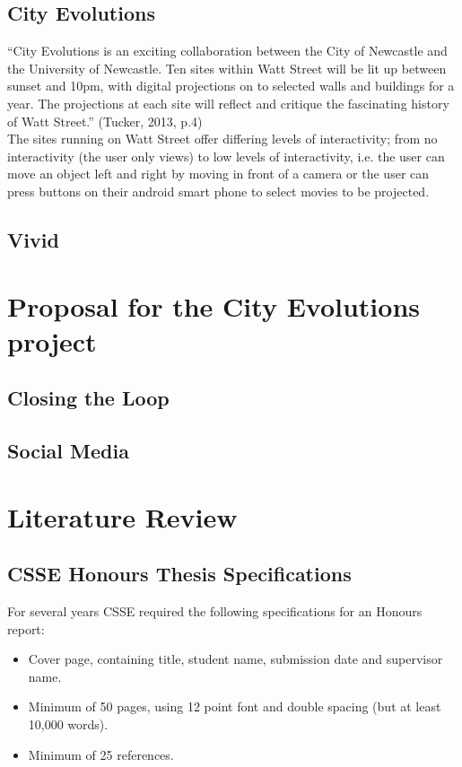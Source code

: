 \documentclass[a4,12pt]{article}
\begin{document}
\subsection{City Evolutions}
``City Evolutions is an exciting collaboration between the City of Newcastle and the University of Newcastle. Ten sites within Watt Street will be lit up between sunset and 10pm, with digital projections on to selected walls and buildings for a year. The projections at each site will reflect and critique the fascinating history of Watt Street.'' (Tucker, 2013, p.4)
\\
The sites running on Watt Street offer differing levels of interactivity; from no interactivity (the user only views) to low levels of interactivity, i.e. the user can move an object left and right by moving in front of a camera or the user can press buttons on their android smart phone to select movies to be projected.
\subsection{Vivid}
\section{Proposal for the City Evolutions project}
\subsection{Closing the Loop}
\subsection{Social Media}
\section{Literature Review}

\subsection{CSSE Honours Thesis Specifications}\label{sec:thesis}
For several years CSSE required the following specifications for an Honours report:
\begin{itemize}
\item Cover page, containing title, student name, submission date and supervisor name.
\item Minimum of 50 pages, using 12 point font and double spacing (but at least 10,000 words).
\item Minimum of 25 references.
\end{itemize}
\end{document}
